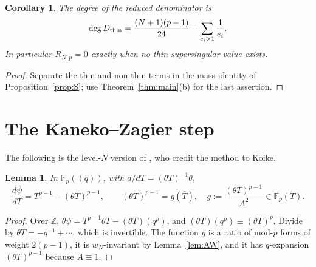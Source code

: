 \documentclass[11pt,a4paper]{article}
\numberwithin{equation}{section}
\newtheorem{lemma}[theorem]{Lemma}
\newtheorem{corollary}[theorem]{Corollary}
\theoremstyle{definition}
\theoremstyle{remark}
\newcommand{\Fp}{\mathbb F_p}
\newcommand{\Z}{\mathbb Z}
\begin{document}
\begin{corollary}\label{cor:degree}
The degree of the reduced denominator is
\[
\deg D_{\rm thin}=\frac{(N+1)(p-1)}{24}-\sum_{e_i>1}\frac1{e_i}.
\]
In particular $R_{N,p}=0$ exactly when no thin supersingular value exists.
\end{corollary}
\begin{proof}
Separate the thin and non-thin terms in the mass identity of
Proposition~\ref{prop:S}; use Theorem~\ref{thm:main}(b) for the last assertion.
\end{proof}

\section{The Kaneko--Zagier step}\label{sec:kz}

The following is the level-$N$ version of \citet[\S10, (35)--(38)]{KZ98}, who credit the method to Koike.

\begin{lemma}\label{lem:dpsi}
In $\Fp((q))$, with $d/dT=(\theta T)^{-1}\theta$,
\[
\frac{d\overline\psi}{dT}=T^{p-1}-(\theta T)^{p-1},\qquad (\theta T)^{p-1}=g(\overline T),\quad
g:=\frac{(\theta T)^{p-1}}{A^2}\in\Fp(T).
\]
\end{lemma}
\begin{proof}
Over $\Z$, $\theta\psi=T^{p-1}\theta T-(\theta T)(q^p)$, and $(\theta T)(q^p)\equiv(\theta T)^p$.
Divide by $\theta T=-q^{-1}+\cdots$, which is invertible. The function $g$ is a ratio of mod-$p$
forms of weight $2(p-1)$, it is $w_N$-invariant by Lemma~\ref{lem:AW}, and it has $q$-expansion
$(\theta T)^{p-1}$ because $A\equiv1$.
\end{proof}
\end{document}
